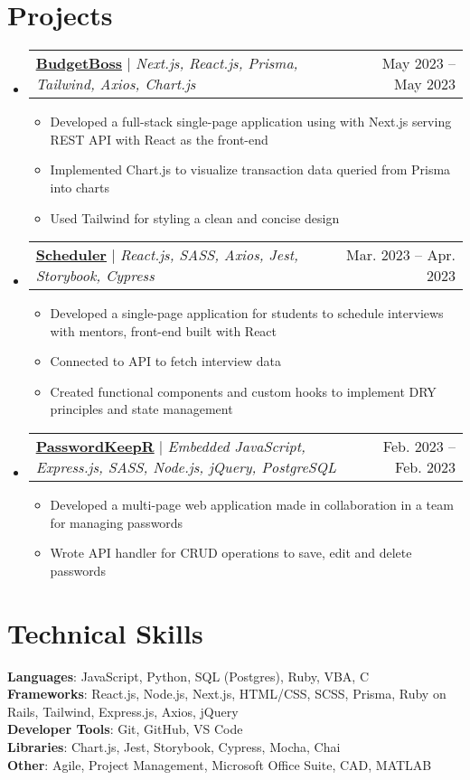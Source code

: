 \documentclass[letterpaper,11pt]{article}
\makeatletter
\newcommand{\resumeItem}[1]{
  \item\small{
    {#1 \vspace{-2pt}}
  }
}
\newcommand{\resumeProjectHeading}[2]{
    \item
    \begin{tabular*}{0.97\textwidth}{l@{\extracolsep{\fill}}r}
      \small#1 & #2 \\
    \end{tabular*}\vspace{-7pt}
}
\newcommand{\resumeSubHeadingListStart}{\begin{itemize}[leftmargin=0.15in, label={}]}
\newcommand{\resumeSubHeadingListEnd}{\end{itemize}}
\newcommand{\resumeItemListStart}{\begin{itemize}}
\newcommand{\resumeItemListEnd}{\end{itemize}\vspace{-5pt}}
\makeatother
\begin{document}
\section{Projects}
    \resumeSubHeadingListStart
      \resumeProjectHeading
          {\href{https://github.com/binding1/budget-boss}{\textbf{\underline{BudgetBoss}}} $|$ \emph{Next.js, React.js, Prisma, Tailwind, Axios, Chart.js}}{May 2023 -- May 2023}
          \resumeItemListStart
            \resumeItem{Developed a full-stack single-page application using with Next.js serving REST API with React as the front-end}
            \resumeItem{Implemented Chart.js to visualize transaction data queried from Prisma into charts}
            \resumeItem{Used Tailwind for styling a clean and concise design}
          \resumeItemListEnd
      \resumeProjectHeading
          {\href{https://github.com/binding1/scheduler}{\textbf{\underline{Scheduler}}} $|$ \emph{React.js, SASS, Axios, Jest, Storybook, Cypress}}{Mar. 2023 -- Apr. 2023}
          \resumeItemListStart
            \resumeItem{Developed a single-page application for students to schedule interviews with mentors, front-end built with React}
            \resumeItem{Connected to API to fetch interview data}
            \resumeItem{Created functional components and custom hooks to implement DRY principles and state management}
          \resumeItemListEnd
                \resumeProjectHeading
          {\href{https://github.com/binding1/PasswordKeepR}{\textbf{\underline{PasswordKeepR}}} $|$ \emph{Embedded JavaScript, Express.js, SASS, Node.js, jQuery, PostgreSQL}}{Feb. 2023 -- Feb. 2023}
          \resumeItemListStart
            \resumeItem{Developed a multi-page web application made in collaboration in a team for managing passwords}
            \resumeItem{Wrote API handler for CRUD operations to save, edit and delete passwords}
          \resumeItemListEnd
    \resumeSubHeadingListEnd



%
\section{Technical Skills}
 \begin{itemize}[leftmargin=0.15in, label={}]
    \small{\item{
     \textbf{Languages}{: JavaScript, Python, SQL (Postgres), Ruby, VBA, C} \\
     \textbf{Frameworks}{: React.js, Node.js, Next.js, HTML/CSS, SCSS, Prisma, Ruby on Rails, Tailwind, Express.js, Axios, jQuery} \\
     \textbf{Developer Tools}{: Git, GitHub, VS Code} \\
     \textbf{Libraries}{: Chart.js, Jest, Storybook, Cypress, Mocha, Chai} \\
     \textbf{Other}{: Agile, Project Management, Microsoft Office Suite, CAD, MATLAB}
    }}
 \end{itemize}


\end{document}

